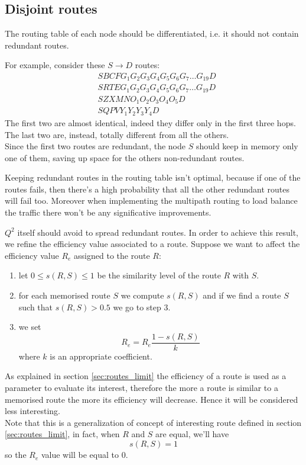 \documentclass[a4paper]{article}
\begin{document}
\subsection{Disjoint routes}
The routing table of each node should be differentiated, i.e. it should not
contain redundant routes.

For example, consider these $S \rightarrow D$ routes:
\begin{align}
	& SBCFG_1G_2G_3G_4G_5G_6G_7 \dots G_{19} D	\\
	& SRTEG_1G_2G_3G_4G_5G_6G_7 \dots G_{19} D	\\
	& SZXMNO_1O_2O_3O_4O_5D				\\
	& SQPVY_1Y_2Y_3Y_4D
\end{align}
The first two are almost identical, indeed they differ only in the first three
hops. The last two are, instead, totally different from all the others.\\
Since the first two routes are redundant, the node $S$ should keep in memory only
one of them, saving up space for the others non-redundant routes.
\newline

Keeping redundant routes in the routing table isn't optimal, because if one of the
routes fails, then there's a high probability that all the other redundant
routes will fail too. Moreover when implementing the multipath routing to load
balance the traffic there won't be any significative improvements.
\newline

$Q^2$ itself should avoid to spread redundant routes. In order to achieve
this result, we refine the efficiency value associated to a route. Suppose we
want to affect the efficiency value $R_e$ assigned to the route $R$:
\begin{enumerate}
	\item let $0\le s(R,S)\le 1$ be the similarity level of the route $R$
		with $S$.
	\item for each memorised route $S$ we compute $s(R,S)$ and if we find
		a route $S$ such that $s(R,S) > 0.5$ we go to step 3.
	\item we set \[R_e = R_e\frac{1-s(R,S)}{k}\] where $k$ is an appropriate
		coefficient.
\end{enumerate}
As explained in section \ref{sec:routes_limit} the efficiency of a route is
used as a parameter to evaluate its interest, therefore the more a route is
similar to a memorised route the more its efficiency will decrease. Hence it
will be considered less interesting.\\
Note that this is a generalization of concept of interesting route defined in
section \ref{sec:routes_limit}, in fact, when $R$ and $S$ are equal, we'll
have
\[s(R,S)=1\]
so the $R_e$ value will be equal to $0$.
\end{document}

